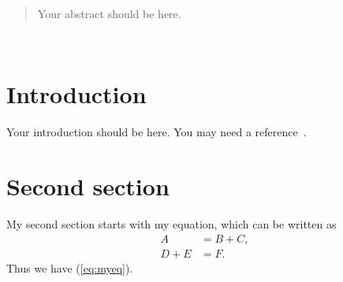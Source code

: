 \documentclass[11pt,a4paper,onecolumn,oneside]{report}
\begin{document}
%

%

\begin{abstract}
Your abstract should be here. \vfill
\end{abstract}

\clearpage

\hbox{ }
\thispagestyle{empty}
\clearpage

\tableofcontents{}
\thispagestyle{empty}
\vfill
\clearpage

\listoffigures{}
\thispagestyle{empty}
\clearpage

\setcounter{page}{1}



\section{Introduction} 

Your introduction should be here. You may need a reference~\cite{ref_sample}.


\newpage 
\section{Second section} 

My second section starts with my equation, which can be written as 
%
\begin{equation}\label{eq:myeq}
\begin{split}
	A 		&= B + C, \\
    D + E	&= F.
\end{split}
\end{equation}
Thus we have (\ref{eq:myeq}).
\end{document}
